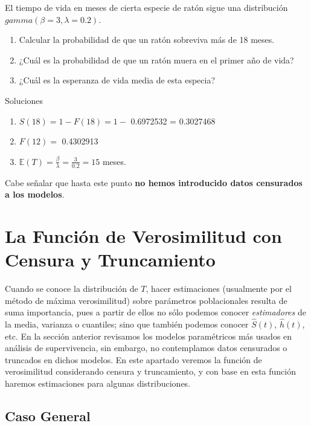 \documentclass[
  a4paper,
  oneside,
  openany]{book}
\providecommand{\tightlist}{%
  \setlength{\itemsep}{0pt}\setlength{\parskip}{0pt}}
\begin{document}
El tiempo de vida en meses de cierta especie de ratón sigue una distribución \(gamma(\beta = 3, \lambda = 0.2)\).

\begin{enumerate}
\def\labelenumi{\arabic{enumi}.}
\tightlist
\item
  Calcular la probabilidad de que un ratón sobreviva más de 18 meses.
\item
  ¿Cuál es la probabilidad de que un ratón muera en el primer año de vida?
\item
  ¿Cuál es la esperanza de vida media de esta especia?
\end{enumerate}

Soluciones

\begin{enumerate}
\def\labelenumi{\arabic{enumi}.}
\tightlist
\item
  \(S(18) = 1-F(18) = 1-\) 0.6972532 = 0.3027468
\item
  \(F(12) =\) 0.4302913
\item
  \(\mathbb{E}(T) = \frac{\beta}{\lambda} = \frac{3}{0.2} = 15\) meses.
\end{enumerate}

Cabe señalar que hasta este punto \textbf{no hemos introducido datos censurados a los modelos}.

\hypertarget{la-funciuxf3n-de-verosimilitud-con-censura-y-truncamiento}{%
\chapter{La Función de Verosimilitud con Censura y Truncamiento}\label{la-funciuxf3n-de-verosimilitud-con-censura-y-truncamiento}}

Cuando se conoce la distribución de \(T\), hacer estimaciones (usualmente por el método de máxima verosimilitud) sobre parámetros poblacionales resulta de suma importancia, pues a partir de ellos no sólo podemos conocer \emph{estimadores} de la media, varianza o cuantiles; sino que también podemos conocer \(\hat S(t)\), \(\hat h(t)\), etc. En la sección anterior revisamos los modelos paramétricos más usados en análisis de supervivencia, sin embargo, no contemplamos datos censurados o truncados en dichos modelos. En este apartado veremos la función de verosimilitud considerando censura y truncamiento, y con base en esta función haremos estimaciones para algunas distribuciones.

\hypertarget{caso-general}{%
\section{Caso General}\label{caso-general}}
\end{document}
